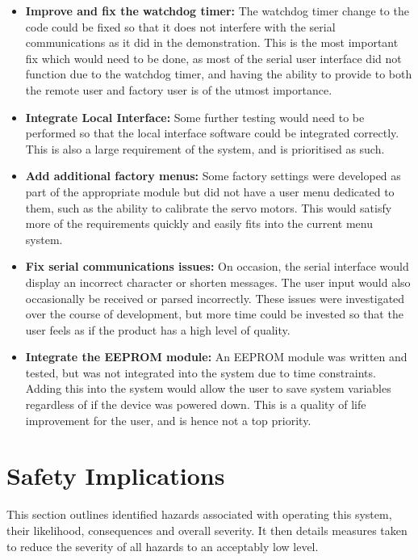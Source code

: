 \documentclass[]{report}
\begin{document}
\begin{itemize}
\item \textbf{Improve and fix the watchdog timer:} The watchdog timer change to the code could be fixed so that it does not interfere with the serial communications as it did in the demonstration. This is the most important fix which would need to be done, as most of the serial user interface did not function due to the watchdog timer, and having the ability to provide to both the remote user and factory user is of the utmost importance. 

\item \textbf{Integrate Local Interface:} Some further testing would need to be performed so that the local interface software could be integrated correctly. This is also a large requirement of the system, and is prioritised as such.

\item \textbf{Add additional factory menus:} Some factory settings were developed as part of the appropriate module but did not have a user menu dedicated to them, such as the ability to calibrate the servo motors. This would satisfy more of the requirements quickly and easily fits into the current menu system.\

\item \textbf{Fix serial communications issues:} On occasion, the serial interface would display an incorrect character or shorten messages. The user input would also occasionally be received or parsed incorrectly. These issues were investigated over the course of development, but more time could be invested so that the user feels as if the product has a high level of quality. 


\item \textbf{Integrate the EEPROM module:} An EEPROM module was written and tested, but was not integrated into the system due to time constraints. Adding this into the system would allow the user to save system variables regardless of if the device was powered down. This is a quality of life improvement for the user, and is hence not a top priority. 
\end{itemize}

\chapter{Safety Implications}
This section outlines identified hazards associated with operating this system, their likelihood, consequences and overall severity. It then details measures taken to reduce the severity of all hazards to an acceptably low level.
\end{document}
